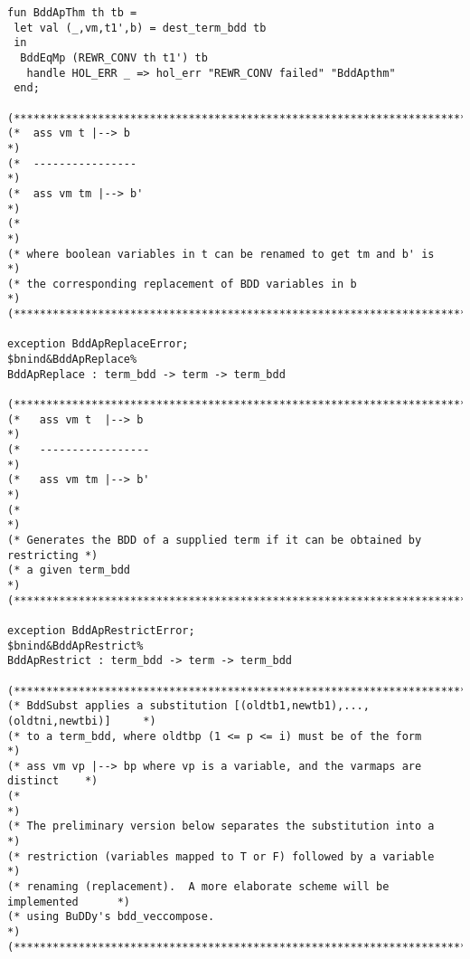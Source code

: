 \documentclass[12pt]{article}
\begin{document}
\begin{footnotesize}
\begin{Verbatim}[commandchars=\$\&\%]
fun BddApThm th tb =
 let val (_,vm,t1',b) = dest_term_bdd tb
 in
  BddEqMp (REWR_CONV th t1') tb 
   handle HOL_ERR _ => hol_err "REWR_CONV failed" "BddApthm"
 end;

(*****************************************************************************)
(*  ass vm t |--> b                                                          *)
(*  ----------------                                                         *)
(*  ass vm tm |--> b'                                                        *)
(*                                                                           *)
(* where boolean variables in t can be renamed to get tm and b' is           *)
(* the corresponding replacement of BDD variables in b                       *)
(*****************************************************************************)

exception BddApReplaceError;
$bnind&BddApReplace%
BddApReplace : term_bdd -> term -> term_bdd

(*****************************************************************************)
(*   ass vm t  |--> b                                                        *)
(*   -----------------                                                       *)
(*   ass vm tm |--> b'                                                       *)
(*                                                                           *)
(* Generates the BDD of a supplied term if it can be obtained by restricting *)
(* a given term_bdd                                                          *)
(*****************************************************************************)

exception BddApRestrictError;
$bnind&BddApRestrict%
BddApRestrict : term_bdd -> term -> term_bdd

(*****************************************************************************)
(* BddSubst applies a substitution [(oldtb1,newtb1),...,(oldtni,newtbi)]     *)
(* to a term_bdd, where oldtbp (1 <= p <= i) must be of the form             *)
(* ass vm vp |--> bp where vp is a variable, and the varmaps are distinct    *)
(*                                                                           *)
(* The preliminary version below separates the substitution into a           *)
(* restriction (variables mapped to T or F) followed by a variable           *)
(* renaming (replacement).  A more elaborate scheme will be implemented      *)
(* using BuDDy's bdd_veccompose.                                             *)
(*****************************************************************************)


\end{Verbatim}
\end{footnotesize}
\end{document}
